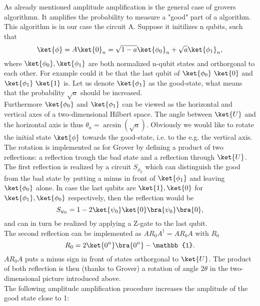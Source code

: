 \documentclass[../../main.tex]{subfiles}
\begin{document}
As already mentioned amplitude amplification is the general case of grovers algorithmn. It amplifies the probability to measure a "good" part of a algorithm.\\
This algorithm is in our case the circuit A. Suppose it initilizes n qubits, such that
\begin{equation}\label{eq:amplitudeAmplA}
  \ket{\phi} = A\ket{0}_{n} = \sqrt{1-a}\ket{\phi_0}_{n} +\sqrt{a}\ket{\phi_1}_{n},
\end{equation}
where $\ket{\phi_0}, \ket{\phi_1}$ are both normalized n-qubit states and orthorgonal to each other.
For example could it be that the last qubit of $\ket{\phi_0} \text{ } \ket{0}$ and $\ket{\phi_1} \text{ } \ket{1}$ is.
Let us denote $\ket{\phi_1}$ as the good-state, what means that the probability $\sqrt{a}$ should be increased.\\
Furthermore $\ket{\phi_0}$ and $\ket{\phi_1}$ can be viewed as the horizontal and vertical axes of a two-dimensional Hilbert space. The angle between $\ket{U}$ and the horizontal axis is thus
$\theta_a = \arcsin(\sqrt{a})$. Obviously we would like to rotate the initial state $\ket{\phi}$ towards the good-state, i.e. to the e.g. the vertical axis.\\
The rotation is implemented as for Grover by defining a product of two reflections: a reflection trough the bad state and a reflection through $\ket{U}$.
The first reflection is realized by a circuit $S_{\phi_0}$ which can distinguish the good from the bad state by putting a minus in front of $\ket{\phi_1}$ and leaving $\ket{\phi_0}$ alone.
In case the last qubits are $\ket{1}, \ket{0}$ for $\ket{\phi_1}, \ket{\phi_0}$ respectively, then the reflection would be
\begin{equation}\label{eq:PhiReflection}
  S_{\psi_0} = 1-2\ket{\psi_0}\ket{0}\bra{\psi_0}\bra{0},
\end{equation}
and can in turn be realized by applying a Z-gate to the last qubit.\\
The second reflection can be implemented as $AR_{0}A^{\dagger} = AR_0A$ with $R_0$
\begin{equation}\label{eq:ZeroReflection}
  R_0 = 2\ket{0^n}\bra{0^n} - \mathbb{1}.
\end{equation}
 $AR_0A$ puts a minus sign in front of states orthorgonal to $\ket{U}$. The product of both reflection is then (thanks to Grover) a rotation of angle
 $2\theta$ in the two-dimensional picture introduced above. \\
 The following amplitude amplification procedure increases the amplitude of the good state close to 1:
\end{document}

